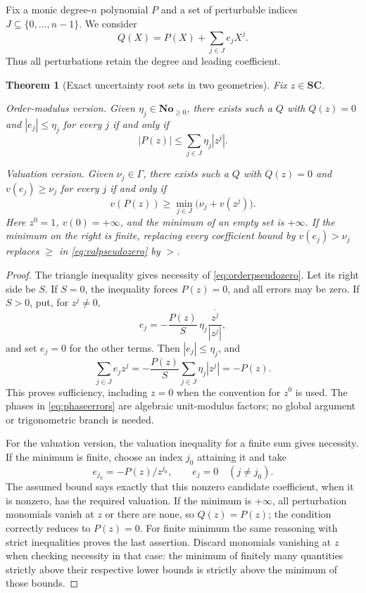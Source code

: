 \documentclass[11pt,letterpaper]{article}
\numberwithin{equation}{section}
\newtheorem{theorem}{Theorem}[section]
\theoremstyle{definition}
\theoremstyle{remark}
\newcommand{\No}{\mathbf{No}}
\newcommand{\SC}{\mathbf{SC}}
\begin{document}
Fix a monic degree-$n$ polynomial $P$ and a set of perturbable indices
$J\subseteq\{0,\ldots,n-1\}$. We consider
\[
 Q(X)=P(X)+\sum_{j\in J}e_jX^j.
\]
Thus all perturbations retain the degree and leading coefficient.

\begin{theorem}[Exact uncertainty root sets in two geometries]\label{thm:pseudozeros}
Fix $z\in\SC$.

\emph{Order-modulus version.} Given $\eta_j\in\No_{\ge0}$, there exists
such a $Q$ with $Q(z)=0$ and $|e_j|\le\eta_j$ for every $j$ if and only if
\begin{equation}\label{eq:orderpseudozero}
 |P(z)|\le\sum_{j\in J}\eta_j|z^j|.
\end{equation}

\emph{Valuation version.} Given $\nu_j\in\Gamma$, there exists such a $Q$
with $Q(z)=0$ and $v(e_j)\ge\nu_j$ for every $j$ if and only if
\begin{equation}\label{eq:valpseudozero}
 v(P(z))\ge\min_{j\in J}\bigl(\nu_j+v(z^j)\bigr).
\end{equation}
Here $z^0=1$, $v(0)=+\infty$, and the minimum of an empty set is
$+\infty$. If the minimum on the right is finite, replacing every
coefficient bound by $v(e_j)>\nu_j$ replaces $\ge$ in
\eqref{eq:valpseudozero} by $>$.
\end{theorem}
\begin{proof}
The triangle inequality gives necessity of \eqref{eq:orderpseudozero}.
Let its right side be $S$. If $S=0$, the inequality forces $P(z)=0$, and
all errors may be zero. If $S>0$, put, for $z^j\ne0$,
\begin{equation}\label{eq:phaseerrors}
 e_j=-\frac{P(z)}S\,\eta_j\frac{\overline{z^j}}{|z^j|},
\end{equation}
and set $e_j=0$ for the other terms. Then $|e_j|\le\eta_j$, and
\[
 \sum_{j\in J}e_jz^j
 =-\frac{P(z)}S\sum_{j\in J}\eta_j|z^j|=-P(z).
\]
This proves sufficiency, including $z=0$ when the convention for $z^0$ is
used. The phases in \eqref{eq:phaseerrors} are algebraic unit-modulus
factors; no global argument or trigonometric branch is needed.

For the valuation version, the valuation inequality for a finite sum gives
necessity. If the minimum is finite, choose an index $j_0$ attaining it
and take
\[
 e_{j_0}=-P(z)/z^{j_0},\qquad e_j=0\quad(j\ne j_0).
\]
The assumed bound says exactly that this nonzero candidate coefficient,
when it is nonzero, has the required valuation. If the minimum is
$+\infty$, all perturbation monomials vanish at $z$ or there are none, so
$Q(z)=P(z)$; the condition correctly reduces to $P(z)=0$.
For finite minimum the same reasoning with strict inequalities proves the
last assertion. Discard monomials vanishing at $z$ when checking
necessity in that case: the minimum of finitely many quantities strictly above their respective lower bounds is
strictly above the minimum of those bounds.
\end{proof}
\end{document}
